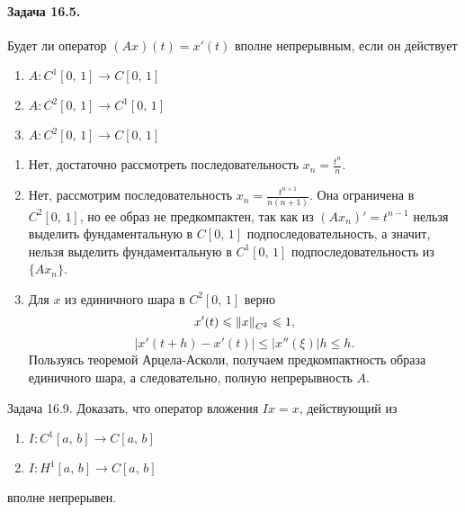 \documentclass[16pt]{article}
\newenvironment{Sol}{\par\noindent{\it Решение:}}
\newcommand\Norm[1]{\left\| #1 \right\|}
\begin{document}
\paragraph{Задача 16.5.} Будет ли оператор $(Ax)(t) = x'(t)$ вполне непрерывным, если он действует 
\begin{enumerate}
\item $A\colon C^1[0,\,1] \to C[0,\,1]$
\item $A\colon C^2[0,\,1] \to C^1[0,\,1]$
\item $A\colon C^2[0,\,1] \to C[0,\,1]$
\end{enumerate}
\begin{Sol}
\begin{enumerate}
\item Нет, достаточно рассмотреть последовательность $x_n = \frac{t^n}{n}$.
\item Нет, рассмотрим последовательность $x_n = \frac{t^{n+1}}{n(n+1)}$. Она ограничена в $C^2[0,\,1]$,
но ее образ не предкомпактен, так как из $(Ax_n)' = t^{n-1}$ нельзя выделить фундаментальную в 
$C[0,\,1]$ подпоследовательность,
а значит, нельзя выделить фундаментальную в $C^1[0,\,1]$ подпоследовательность из $\{Ax_n\}$.
\item Для $x$ из единичного шара в $C^2[0,\,1]$ верно
$$x'(t) \leqslant \Norm{x}_{C^2} \leqslant 1,$$
$$|x'(t+h) - x'(t)| \leqslant |x''(\xi)|h \leqslant h.$$
Пользуясь теоремой Арцела-Асколи, получаем предкомпактность образа единичного шара, а следовательно, полную
непрерывность $A$.
\end{enumerate}
\end{Sol}

\paragraph{Задача 16.9.} Доказать, что оператор вложения $Ix = x$, действующий из
\begin{enumerate}
\item $I\colon C^1[a,\,b] \to C[a,\,b]$
\item $I\colon H^1[a,\,b] \to C[a,\,b]$
\end{enumerate}
вполне непрерывен.
\end{document}
